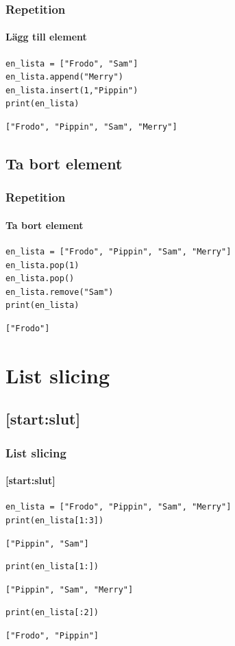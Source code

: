 \documentclass[aspectratio=169]{beamer}
\begin{document}
\begin{frame}[fragile]
	\frametitle{Repetition}
	\framesubtitle{Lägg till element}
	
	\begin{lstlisting}
en_lista = ["Frodo", "Sam"]
en_lista.append("Merry")
en_lista.insert(1,"Pippin")
print(en_lista)
	\end{lstlisting}
	
	\pause
	
	\begin{lstlisting}
["Frodo", "Pippin", "Sam", "Merry"]
	\end{lstlisting}
	
\end{frame}

\subsection{Ta bort element}

\begin{frame}[fragile]
	\frametitle{Repetition}
	\framesubtitle{Ta bort element}
	
	\begin{lstlisting}
en_lista = ["Frodo", "Pippin", "Sam", "Merry"]
en_lista.pop(1)
en_lista.pop()
en_lista.remove("Sam")
print(en_lista)
	\end{lstlisting}
	
	\pause
	
	\begin{lstlisting}
["Frodo"]
	\end{lstlisting}
	
\end{frame}

\section{List slicing}

\subsection{[start:slut]}

\begin{frame}[fragile]
	\frametitle{List slicing}
	\framesubtitle{[start:slut]}
	
	\begin{lstlisting}
en_lista = ["Frodo", "Pippin", "Sam", "Merry"]
print(en_lista[1:3])
	\end{lstlisting}
	\begin{lstlisting}
["Pippin", "Sam"]
	\end{lstlisting}
	\pause
	\begin{lstlisting}
print(en_lista[1:])
	\end{lstlisting}
	\begin{lstlisting}
["Pippin", "Sam", "Merry"]
	\end{lstlisting}
	\pause
	\begin{lstlisting}
print(en_lista[:2])
	\end{lstlisting}
	\begin{lstlisting}
["Frodo", "Pippin"]
	\end{lstlisting}
	
	
\end{frame}
\end{document}
